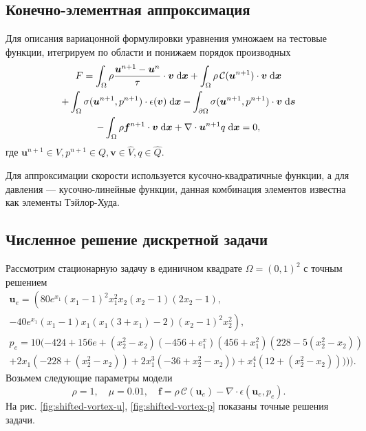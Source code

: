 \documentclass[a4paper,10pt]{report}
\begin{document}
\subsection{Конечно-элементная аппроксимация}

Для описания вариацонной формулировки уравнения умножаем на тестовые функции, итегрируем по области и понижаем порядок производных
\begin{equation}
\begin{gathered}
F = \int_\Omega \rho \frac{\bm{u}^{n+1} - \bm{u}^n}{\tau} \cdot \bm{v} \;{\rm d}\bm{x}
 + \int_\Omega \rho \,\mathcal{C}(\bm{u}^{n+1}) \cdot \bm{v} \;{\rm d}\bm{x} \\
 + \int_\Omega \sigma(\bm{u}^{n+1}, p^{n+1}) \cdot \epsilon(\bm{v}) \;{\rm d}\bm{x} 
 - \int_{\partial \Omega} \sigma(\bm{u}^{n+1}, p^{n+1}) \cdot \bm{v} \;{\rm d}\bm{s} \\
 - \int_\Omega \rho \bm{f}^{n+1} \cdot \bm{v} \;{\rm d}\bm{x} 
 + \nabla \cdot \bm{u}^{n+1} q \;{\rm d}\bm{x} = 0,
\end{gathered}
\label{eq:nonlinear-form}
\end{equation}
где $\bm{u}^{n+1} \in V, p^{n+1} \in Q, \bm{v} \in \widehat{V}, q \in \widehat{Q}$.

Для аппроксимации скорости используется кусочно-квадратичные функции, а для давления --- кусочно-линейные функции, данная комбинация элементов известна как элементы Тэйлор-Худа.

\subsection{Численное решение дискретной задачи}

Рассмотрим стационарную задачу в единичном квадрате $\Omega=(0,1)^2$ с точным решением
\begin{equation}
\begin{gathered}
\bm{u}_e = \left(80 e^{x_1}(x_1 - 1)^2 x_1^2 x_2 (x_2 -  1) (2 x_2 - 1),\right.\\
\left. -40 e^{x_1} (x_1 - 1) x_1 (x_1 (3 + x_1) - 2) (x_2-1)^2 x_2^2\right), \\
p_e = 10 (-424 + 156 e + (x_2^2-x_2) (-456 + e^x_1) (456 + x_1^2) (228 - 5 (x_2^2 - x_2)) \\
+ 2 x_1 (-228 + (x_2^2 - x_2)) + 2 x_1^3 (-36 + x_2^2 - x_2)) + x_1^4 (12 + (x_2^2 - x_2))))).
\end{gathered}
\label{eq:shifted-vortex}
\end{equation}
Возьмем следующие параметры модели
\[
\rho = 1, \quad \mu = 0.01, \quad \bm{f} = \rho \,\mathcal{C}(\bm{u}_e) - \nabla \cdot \epsilon(\bm{u}_e, p_e).
\]
На рис. \ref{fig:shifted-vortex-u}, \ref{fig:shifted-vortex-p} показаны точные решения задачи.
\end{document}
